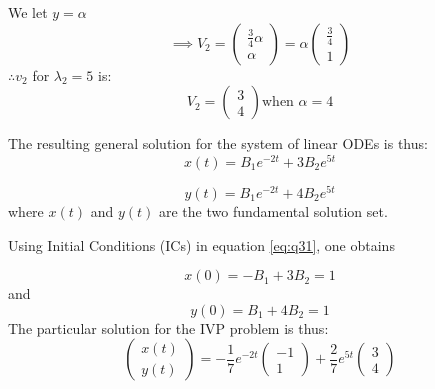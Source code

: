 \documentclass[12pt,a4paper]{article}
\begin{document}
\begin{enumerate}
    We let $y=\alpha $
     \[ 
      \implies V_2=\begin{pmatrix} \frac{3}{4}\alpha \\ \alpha \end{pmatrix}
      =\alpha \begin{pmatrix} \frac{3}{4} \\ 1 \end{pmatrix}
    \]
     $\therefore v_2 $ for  $\lambda_2 =5$ is: 
    \[ 
      V_2= \begin{pmatrix} 3 \\ 4 \end{pmatrix} \text{when } \alpha=4
    \]


    The resulting general solution for the system of linear ODEs is thus:
    \begin{equation*}
    x(t)= B_1e^{-2t} + 3B_2e^{5t}    
    \end{equation*}

    \begin{equation*}
    y(t)= B_1e^{-2t} + 4B_2e^{5t}    
    \end{equation*}
    where $x(t)$  and $y(t)$ are the two fundamental solution set.
    
  Using Initial Conditions (ICs) in equation  \eqref{eq:q31},  one obtains

  \begin{equation*}
    x(0)= -B_1 + 3B_2=1     
  \end{equation*}
  and 
  \begin{equation*}
    y(0)= B_1 + 4B_2=1   
  \end{equation*}
  The particular solution for the IVP problem is thus:
    \[ 
      \begin{pmatrix} x(t)\\ y(t) \end{pmatrix}
      =-\frac{1}{7}e^{-2t} \begin{pmatrix} -1 \\ 1    \end{pmatrix} + \frac{2}{7}e^{5t}  \begin{pmatrix} 3 \\ 4    \end{pmatrix} 
    \]



\end{enumerate}
\end{document}
